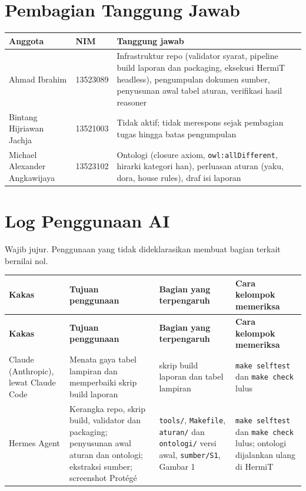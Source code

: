 \documentclass[11pt,a4paper]{article}
\begin{document}
\section{Pembagian Tanggung Jawab}

\begin{tabular}{@{}p{3.4cm} p{2.4cm} p{8.2cm}@{}}
\toprule
\textbf{Anggota} & \textbf{NIM} & \textbf{Tanggung jawab} \\
\midrule
Ahmad Ibrahim & 13523089 & Infrastruktur repo (validator syarat, pipeline build laporan dan packaging, eksekusi HermiT headless), pengumpulan dokumen sumber, penyusunan awal tabel aturan, verifikasi hasil reasoner \\
Bintang Hijriawan Jachja & 13521003 & Tidak aktif; tidak merespons sejak pembagian tugas hingga batas pengumpulan \\
Michael Alexander Angkawijaya & 13523102 & Ontologi (closure axiom, \texttt{owl:allDifferent}, hirarki kategori han), perluasan aturan (yaku, dora, house rules), draf isi laporan \\
\bottomrule
\end{tabular}

\section{Log Penggunaan AI}

Wajib jujur. Penggunaan yang tidak dideklarasikan membuat bagian terkait bernilai nol.

\begin{longtable}{@{}p{2.3cm} p{3.6cm} p{3.4cm} p{4.2cm}@{}}
\toprule
\textbf{Kakas} & \textbf{Tujuan penggunaan} & \textbf{Bagian yang terpengaruh} & \textbf{Cara kelompok memeriksa} \\
\midrule
\endfirsthead
\toprule
\textbf{Kakas} & \textbf{Tujuan penggunaan} & \textbf{Bagian yang terpengaruh} & \textbf{Cara kelompok memeriksa} \\
\midrule
\endhead
Claude (Anthropic), lewat Claude Code & Menata gaya tabel lampiran dan memperbaiki skrip build laporan & skrip build laporan dan tabel lampiran & \texttt{make selftest} dan \texttt{make check} lulus \\
Hermes Agent & Kerangka repo, skrip build, validator dan packaging; penyusunan awal aturan dan ontologi; ekstraksi sumber; screenshot Protégé & \texttt{tools/}, \texttt{Makefile}, \texttt{aturan/} dan \texttt{ontologi/} versi awal, \texttt{sumber/S1}, Gambar 1 & \texttt{make selftest} dan \texttt{make check} lulus; ontologi dijalankan ulang di HermiT \\
\midrule
\bottomrule
\end{longtable}
\end{document}
